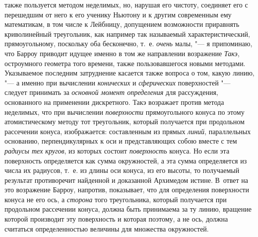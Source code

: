 также пользуется методом неделимых, но, нарушая его чистоту, соединяет его с
перешедшим от него к его ученику Ньютону и к другим современным ему
математикам, в том числе к Лейбницу, допущением возможности приравнять
криволинейный треугольник, как например так называемый характеристический,
прямоугольному, поскольку оба бесконечно, т.~е. {\em очень} малы, "--- я
припоминаю, что Барроу приводит идущее именно в том же направлении возражение
{\em Такэ}, остроумного геометра того времени, также пользовавшегося новыми
методами. Указываемое последним затруднение касается также вопроса о том, какую
линию, "--- а именно при вычислении {\em конических} и {\em сферических}
поверхностей "--- следует принимать за {\em основной момент определения} для
рассуждения, основанного на применении дискретного. Такэ возражает против
метода неделимых, что при вычислении {\em поверхности} прямоугольного конуса по
этому атомистическому методу тот треугольник, который получается при продольном
рассечении конуса, изображается: составленным из прямых {\em линий},
параллельных основанию, перпендикулярных к оси и представляющих собою вместе с
тем {\em радиусы тех кругов}, из которых состоит {\em поверхность} конуса. Но
если эта поверхность определяется как сумма окружностей, а эта сумма
определяется из числа их радиусов, т.~е. из длины оси конуса, из его высоты, то
получаемый результат противоречит найденной и доказанной Архимедом истине.
В~ответ на это возражение Барроу, напротив, показывает, что для определения
поверхности конуса не его ось, а {\em сторона} того треугольника, который
получается при продольном рассечении конуса, должна быть принимаема за ту
линию, вращение которой производит эту поверхность и которая поэтому, а не ось,
должна считаться определенностью величины для множества окружностей.

